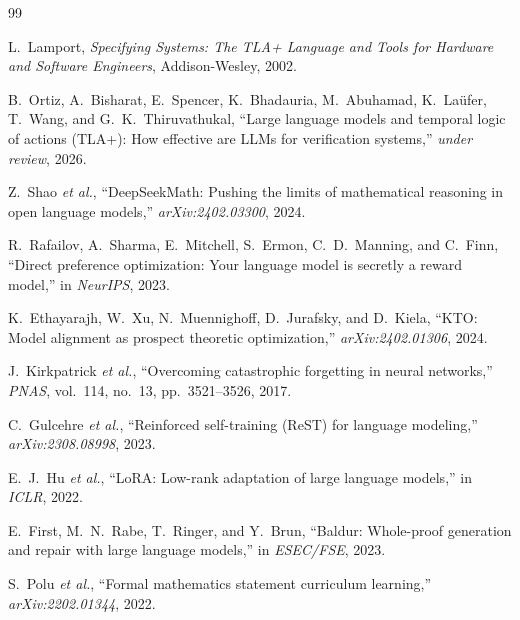 \documentclass[10pt,twocolumn]{article}
\begin{document}
{\small
\begin{thebibliography}{99}

L.~Lamport, \emph{Specifying Systems: The TLA+ Language and Tools for
Hardware and Software Engineers}, Addison-Wesley, 2002.

B.~Ortiz, A.~Bisharat, E.~Spencer, K.~Bhadauria, M.~Abuhamad,
K.~La\"ufer, T.~Wang, and G.~K.~Thiruvathukal,
``Large language models and temporal logic of actions ({TLA}+):
How effective are {LLM}s for verification systems,''
\textit{under review}, 2026.

Z.~Shao \emph{et al.},
``DeepSeekMath: Pushing the limits of mathematical reasoning in open
language models,'' \textit{arXiv:2402.03300}, 2024.

R.~Rafailov, A.~Sharma, E.~Mitchell, S.~Ermon, C.~D.~Manning, and C.~Finn,
``Direct preference optimization: Your language model is secretly a reward
model,'' in \textit{NeurIPS}, 2023.

K.~Ethayarajh, W.~Xu, N.~Muennighoff, D.~Jurafsky, and D.~Kiela,
``KTO: Model alignment as prospect theoretic optimization,''
\textit{arXiv:2402.01306}, 2024.

J.~Kirkpatrick \emph{et al.},
``Overcoming catastrophic forgetting in neural networks,''
\textit{PNAS}, vol.~114, no.~13, pp.~3521--3526, 2017.

C.~Gulcehre \emph{et al.},
``Reinforced self-training (ReST) for language modeling,''
\textit{arXiv:2308.08998}, 2023.

E.~J.~Hu \emph{et al.},
``LoRA: Low-rank adaptation of large language models,'' in \textit{ICLR}, 2022.

E.~First, M.~N.~Rabe, T.~Ringer, and Y.~Brun,
``Baldur: Whole-proof generation and repair with large language models,''
in \textit{ESEC/FSE}, 2023.

S.~Polu \emph{et al.},
``Formal mathematics statement curriculum learning,''
\textit{arXiv:2202.01344}, 2022.

\end{thebibliography}
}

\appendix
\end{document}
